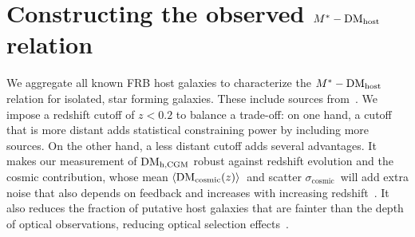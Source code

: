 \documentclass[twocolumn,linenumbers]{aastex631}
\newcommand{\avgdmcosmic}{\ensuremath{\langle {\rm DM}_{\rm cosmic}(z) \rangle}}
\newcommand{\dmh}{\ensuremath{{\rm DM}_\textrm{host}}}
\newcommand{\dmhcgm}{\ensuremath{{\rm DM}_\textrm{h,CGM}}}
\newcommand{\sigmacosmic}{\ensuremath{{\sigma}_\textrm{cosmic}}}
\begin{document}
\section{Constructing the observed $M^*-\dmh$ relation}\label{sec:sample}
We aggregate all known FRB host galaxies to characterize the $M^*-\dmh$ relation for isolated, star forming galaxies.
These include sources from~\citet{macquart2020census,bhandari2020host,lanman2022sudden,leewadell2023host,michilli2023subarcminute,gordon2023demographics,bhardwaj2024host,law2024deep,sharma2024preferential,connor2024gas,cassanelli2024fast,shannon2024commensal,chime2025catalog,ravi2025deep}.
We impose a redshift cutoff of $z < 0.2$ to balance a trade-off:
on one hand, a cutoff that is more distant adds statistical constraining power by including more sources.
On the other hand, a less distant cutoff adds several advantages.
It makes our measurement of $\dmhcgm$ robust against redshift evolution and the cosmic contribution, whose mean \avgdmcosmic\ and scatter \sigmacosmic\ will add extra noise that also depends on feedback and increases with increasing redshift~\citep{jaroszynski2019fast,batten2021cosmic, walker2024dispersion}. 
It also reduces the fraction of putative host galaxies that are fainter than the depth of optical observations, reducing optical selection effects~\citep{seebeck2021effects,marnoch2023unseen,jahnsschindler2023how,hewitt2024repeating}.
\end{document}
